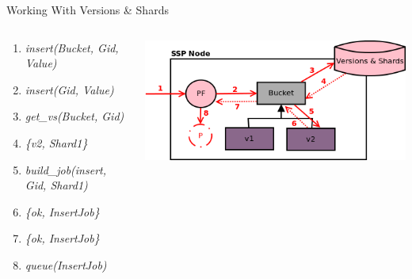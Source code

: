 \documentclass[aspectratio=43]{beamer}
\begin{document}
\begin{frame}{Working With Versions \& Shards}
    \begin{columns}
        \begin{column}[c]{0.5\textwidth}
            \begin{enumerate}
                \item \emph{insert(Bucket, Gid, Value)}
                \item \emph{insert(Gid, Value)}
                \item \emph{get\_vs(Bucket, Gid)}
                \item \emph{\{v2, Shard1\}}
                \item \emph{build\_job(insert, Gid, Shard1)}
                \item \emph{\{ok, InsertJob\}}
                \item \emph{\{ok, InsertJob\}}
                \item \emph{queue(InsertJob)}
            \end{enumerate}
        \end{column}
        \begin{column}[c]{0.5\textwidth}
            \includegraphics[width=\textwidth]{images/versionsandshards.png}
        \end{column}
    \end{columns}
\end{frame}
\end{document}
